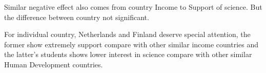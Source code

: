\documentclass[12pt]{article}
\begin{document}
Similar negative effect also comes from country Income to Support of science. But the difference between country not significant.

For individual country, Netherlands and Finland deserve special attention,
 the former show extremely support compare with other similar income countries
  and the latter's students shows lower interest in science compare with other similar Human Development countries.

\newpage
%
%

 
\end{document}
